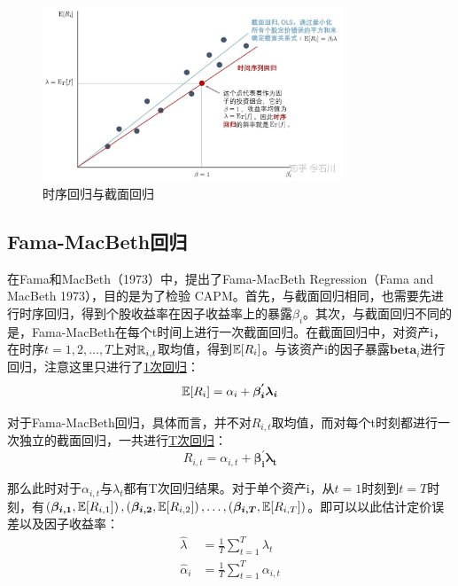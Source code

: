 \documentclass[11pt]{article}
\begin{document}
\begin{figure}[H]
    \centering
    \includegraphics[width=0.8\textwidth]{fig/ts_vs_cs.jpg}
    \caption{时序回归与截面回归}
    \label{fig:ts_vs_cs}
\end{figure}

\subsection{Fama-MacBeth回归}

在Fama和MacBeth（1973）中，提出了Fama-MacBeth Regression（Fama and MacBeth 1973），目的是为了检验 CAPM。首先，与截面回归相同，也需要先进行时序回归，得到个股收益率在因子收益率上的暴露$\beta_i$。其次，与截面回归不同的是，Fama-MacBeth在每个t时间上进行一次截面回归。在截面回归中，对资产i，在时序$t=1,2,\dots,T$上对$\mathbb{R}_{i,t}$取均值，得到$\mathbb{E}[R_i]$。与该资产i的因子暴露$\bm{beta}_i$进行回归，注意这里只进行了\uline{1次回归}：
\begin{equation*}
    \mathbb{E}[R_i] = \alpha_i + \bm{\beta_{i}^{'} \lambda_i}
\end{equation*}

对于Fama-MacBeth回归，具体而言，并不对$R_{i,t}$取均值，而对每个t时刻都进行一次独立的截面回归，一共进行\uline{T次回归}：
\begin{equation*}
    R_{i,t} = \alpha_{i,t} + \bm{\beta_{i}^{'} \lambda_t}
\end{equation*}

那么此时对于$\alpha_{i,t}$与$\lambda_t$都有T次回归结果。对于单个资产i，从$t=1$时刻到$t=T$时刻，有$\left(\bm{\beta_{i,1}},\mathbb{E}[R_{i,1}]\right),\left(\bm{\beta_{i,2}},\mathbb{E}[R_{i,2}]\right),\dots,\left(\bm{\beta_{i,T}},\mathbb{E}[R_{i,T}]\right)$。即可以以此估计定价误差以及因子收益率：
\begin{align*}
    \hat{\lambda} &= \frac{1}{T} \sum_{t=1}^{T} \lambda_t \\
    \hat{\alpha}_i &= \frac{1}{T} \sum_{t=1}^{T} \alpha_{i,t}
\end{align*}
\end{document}
